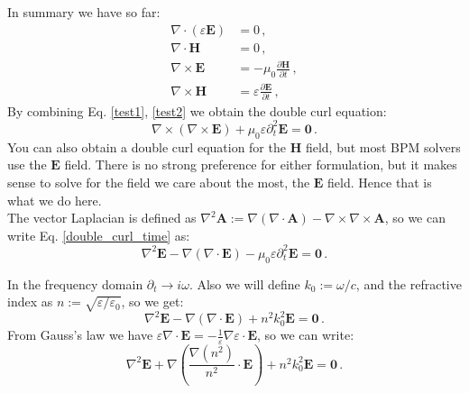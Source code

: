 \documentclass[]{article}
\begin{document}
	In summary we have so far:
		\begin{subequations}
		\begin{align}
			\nabla \cdot \left( \varepsilon \textbf{E}\right)  &= 0\, , \\
			\nabla \cdot \textbf{H} &= 0 \, ,\\
			\nabla \times \textbf{E} &= -\mu_0 \frac{\partial \textbf{H}}{\partial t}\, ,\label{test1}\\			
			\nabla \times \textbf{H} &= \varepsilon \frac{\partial \textbf{E}}{\partial t} \, , 	\label{test2}		
		\end{align}
		\label{Maxwell2}
	\end{subequations}
	By combining Eq. \eqref{test1}, \eqref{test2} we obtain the double curl equation:
	\begin{equation}
		\nabla \times \left( \nabla \times \textbf{E}\right)  +\mu_0 \varepsilon \partial_t^2 \textbf{E} = \textbf{0}\,.
		\label{double_curl_time}
	\end{equation}	
	You can also obtain a double curl equation for the $\textbf{H}$ field, but most BPM solvers use the $\textbf{E}$ field. There is no strong preference for either formulation, but it makes sense to solve for the field we care about the most, the $\textbf{E}$ field. Hence that is what we do here.\\
	
	The vector Laplacian is defined as $\nabla^2 \textbf{A} := \nabla(\nabla\cdot \textbf{A})-\nabla \times \nabla \times \textbf{A}$, so we can write Eq. \eqref{double_curl_time} as:
	\begin{equation}
		\nabla^2 \textbf{E} -  \nabla(\nabla\cdot \textbf{E}) -\mu_0 \varepsilon \partial_t^2 \textbf{E} = \textbf{0}\, .
	\end{equation}
	
	In the frequency domain $\partial_t \to i\omega$. Also we will define $k_0 := \omega/c$, and the refractive index as $n:=\sqrt{\varepsilon/\varepsilon_0}$, so we get:
	\begin{equation}
		\nabla^2 \textbf{E} -  \nabla(\nabla\cdot \textbf{E}) +n^2k_0^2 \textbf{E} = \textbf{0}\, .
	\end{equation}
	From Gauss's law we have $\varepsilon \nabla\cdot \textbf{E} = - \frac{1}{\varepsilon}\nabla \varepsilon \cdot \textbf{E}$, so we can write:
	\begin{equation}
		\nabla^2 \textbf{E} +  \nabla\left( \frac{\nabla(n^2)}{n^2}\cdot \textbf{E}\right)  +n^2k_0^2 \textbf{E} = \textbf{0}\, .
		\label{Laplacian_eq}
	\end{equation}
	
\end{document}
